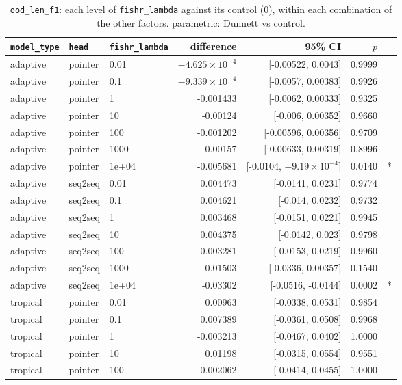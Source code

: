 \documentclass[10pt]{article}
\begin{document}
{\small
\begin{longtable}{lllrrrl}
\caption{\texttt{ood\_len\_f1}: each level of \texttt{fishr\_lambda} against its control (0), within each combination of the other factors. parametric: Dunnett vs control.}\label{tab:control-ood_len_f1}\\
\toprule
\texttt{model\_type} & \texttt{head} & \texttt{fishr\_lambda} & difference & 95\% CI & $p$ & \\
\midrule
\endhead
adaptive & pointer & 0.01 & $-4.625\times10^{-4}$ & [-0.00522, 0.0043] & 0.9999 & \\
adaptive & pointer & 0.1 & $-9.339\times10^{-4}$ & [-0.0057, 0.00383] & 0.9926 & \\
adaptive & pointer & 1 & -0.001433 & [-0.0062, 0.00333] & 0.9325 & \\
adaptive & pointer & 10 & -0.00124 & [-0.006, 0.00352] & 0.9660 & \\
adaptive & pointer & 100 & -0.001202 & [-0.00596, 0.00356] & 0.9709 & \\
adaptive & pointer & 1000 & -0.00157 & [-0.00633, 0.00319] & 0.8996 & \\
adaptive & pointer & 1e+04 & -0.005681 & [-0.0104, $-9.19\times10^{-4}$] & 0.0140 & *\\
adaptive & seq2seq & 0.01 & 0.004473 & [-0.0141, 0.0231] & 0.9774 & \\
adaptive & seq2seq & 0.1 & 0.004621 & [-0.014, 0.0232] & 0.9732 & \\
adaptive & seq2seq & 1 & 0.003468 & [-0.0151, 0.0221] & 0.9945 & \\
adaptive & seq2seq & 10 & 0.004375 & [-0.0142, 0.023] & 0.9798 & \\
adaptive & seq2seq & 100 & 0.003281 & [-0.0153, 0.0219] & 0.9960 & \\
adaptive & seq2seq & 1000 & -0.01503 & [-0.0336, 0.00357] & 0.1540 & \\
adaptive & seq2seq & 1e+04 & -0.03302 & [-0.0516, -0.0144] & 0.0002 & *\\
tropical & pointer & 0.01 & 0.00963 & [-0.0338, 0.0531] & 0.9854 & \\
tropical & pointer & 0.1 & 0.007389 & [-0.0361, 0.0508] & 0.9968 & \\
tropical & pointer & 1 & -0.003213 & [-0.0467, 0.0402] & 1.0000 & \\
tropical & pointer & 10 & 0.01198 & [-0.0315, 0.0554] & 0.9551 & \\
tropical & pointer & 100 & 0.002062 & [-0.0414, 0.0455] & 1.0000 & \\

\end{longtable}}
\end{document}
